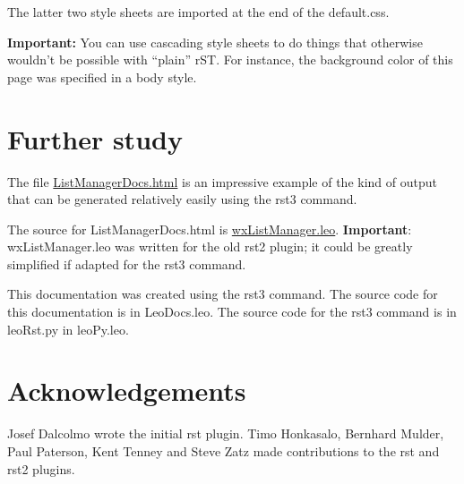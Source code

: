 \documentclass[a4paper,10pt,english]{sphinxmanual}
\begin{document}
The latter two style sheets are imported at the end of the default.css.

\textbf{Important:} You can use cascading style sheets to do things that otherwise
wouldn't be possible with ``plain'' rST. For instance, the background color of
this page was specified in a body style.


\section{Further study}
\label{rstplugin3:further-study}
The file \href{http://webpages.charter.net/edreamleo/ListManagerDocs.html}{ListManagerDocs.html} is an impressive example of the kind of output
that can be generated relatively easily using the rst3 command.

The source for ListManagerDocs.html is \href{http://webpages.charter.net/edreamleo/wxListManager.leo}{wxListManager.leo}. \textbf{Important}:
wxListManager.leo was written for the old rst2 plugin; it could be greatly
simplified if adapted for the rst3 command.

This documentation was created using the rst3 command. The source code for this
documentation is in LeoDocs.leo. The source code for the rst3 command is in
leoRst.py in leoPy.leo.


\section{Acknowledgements}
\label{rstplugin3:acknowledgements}
Josef Dalcolmo wrote the initial rst plugin.
Timo Honkasalo, Bernhard Mulder, Paul Paterson, Kent Tenney and
Steve Zatz made contributions to the rst and rst2 plugins.
\end{document}
